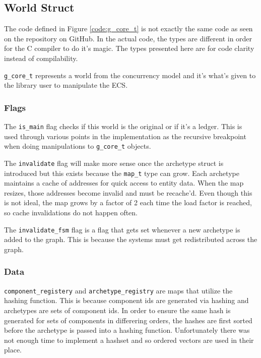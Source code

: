 \subsection{World Struct}
The code defined in Figure \ref{code:g_core_t} is not exactly the same code as seen on the repository on GitHub. In the actual code, the types are different in order for the C compiler to do it's magic. The types presented here are for code clarity instead of compilability.

\texttt{g\_core\_t} represents a world from the concurrency model and it's what's given to the library user to manipulate the ECS.

\subsubsection{Flags}
The \texttt{is\_main} flag checks if this world is the original or if it's a ledger. This is used through various points in the implementation as the recursive breakpoint when doing manipulations to \texttt{g\_core\_t} objects. 

The \texttt{invalidate} flag will make more sense once the archetype struct is introduced but this exists because the \texttt{map\_t} type can grow. Each archetype maintains a cache of addresses for quick access to entity data. When the map resizes, those addresses become invalid and must be recache'd. Even though this is not ideal, the map grows by a factor of 2 each time the load factor is reached, so cache invalidations do not happen often. 

The \texttt{invalidate\_fsm} flag is a flag that gets set whenever a new archetype is added to the graph. This is because the systems must get redistributed across the graph.

\subsubsection{Data}
\texttt{component\_registery} and \texttt{archetype\_registry} are maps that utilize the hashing function. This is because component ids are generated via hashing and archetypes are sets of component ids. In order to ensure the same hash is generated for sets of components in differering orders, the hashes are first sorted before the archetype is passed into a hashing function. Unfortunately there was not enough time to implement a hashset and so ordered vectors are used in their place.

